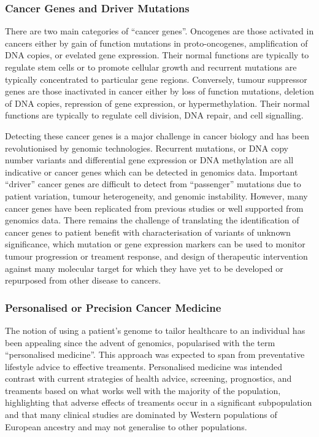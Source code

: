 \subsubsection{Cancer Genes and Driver Mutations}
There are two main categories of ``cancer genes''. Oncogenes are those activated in cancers either by gain of function mutations in proto-oncogenes, amplification of DNA copies, or evelated gene expression. Their normal functions are typically to regulate stem cells or to promote cellular growth and recurrent mutations are typically concentrated to particular gene regions. Conversely, tumour suppressor genes are those inactivated in cancer either by loss of function mutations, deletion of DNA copies, repression of gene expression, or hypermethylation. Their normal functions are typically to regulate cell division, DNA repair, and cell signalling.

Detecting these cancer genes is a major challenge in cancer biology and has been revolutionised by genomic technologies. Recurrent mutations, or DNA copy number variants and differential gene expression or DNA methylation are all indicative or cancer genes which can be detected in genomics data. Important ``driver'' cancer genes are difficult to detect from ``passenger'' mutations due to patient variation, tumour heterogeneity, and genomic instability. However, many cancer genes have been replicated from previous studies or well supported from genomics data. There remains the challenge of translating the identification of cancer genes to patient benefit with characterisation of variants of unknown significance, which mutation or gene expression markers can be used to monitor tumour progression or treament response, and design of therapeutic intervention against many molecular target for which they have yet to be developed or repurposed from other disease to cancers. 

\subsubsection{Personalised or Precision Cancer Medicine}
The notion of using a patient's genome to tailor healthcare to an individual has been appealing since the advent of genomics, popularised with the term ``personalised medicine''. This approach was expected to span from preventative lifestyle advice to effective treaments. Personalised medicine was intended contrast with current strategies of health advice, screening, prognostics, and treaments based on what works well with the majority of the population, highlighting that adverse effects of treaments occur in a significant subpopulation and that many clinical studies are dominated by Western populations of European ancestry and may not generalise to other populations.


